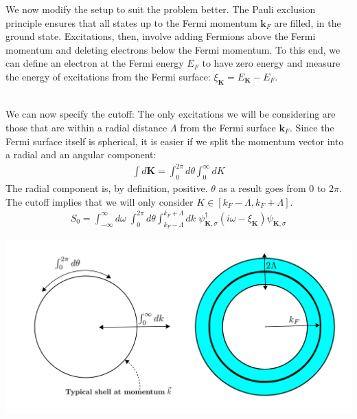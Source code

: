 \documentclass[14pt]{extarticle}
\begin{document}
We now modify the setup to suit the problem better. The Pauli exclusion principle ensures that all states up to the Fermi momentum \(\mathbf{k}_F\) are filled, in the ground state. Excitations, then, involve adding Fermions above the Fermi momentum and deleting electrons below the Fermi momentum. To this end, we can define an electron at the Fermi energy \(E_F\) to have zero energy and measure the energy of excitations from the Fermi surface: \(\xi_{\mathbf K} = E_{\mathbf K} - E_F\).
\\\\
\begin{minipage}{0.45\textwidth}
We can now specify the cutoff: The only excitations we will be considering are those that are within a radial distance \(\Lambda\) from the Fermi surface \(\mathbf{k}_F\). Since the Fermi surface itself is spherical, it is easier if we split the momentum vector into a radial and an angular component:
\begin{equation}\begin{aligned}
\int d\mathbf{K} = \int_0^{2\pi} d\theta \int_0^\infty dK
\end{aligned}\end{equation}
The radial component is, by definition, positive. \(\theta\) as a result goes from \(0\) to \(2\pi\). The cutoff implies that we will only consider \(K \in \left[k_F - \Lambda, k_F + \Lambda\right]\).
\begin{equation}\begin{aligned}
	S_0 = \int_{-\infty}^\infty d\omega\;\int_0^{2\pi} d\theta \int_{k_F - \Lambda}^{k_F + \Lambda}  dk\; \psi_{\mathbf{K},\sigma}^\dagger \left(i\omega - \xi_{\mathbf{K}}\right)\psi_{\mathbf{K},\sigma}
\end{aligned}\end{equation}
\end{minipage}
\hspace*{\fill}
\begin{minipage}{0.5\textwidth}
\centering
\includegraphics[width=\textwidth]{./figures/fermi-rg.png}
\end{minipage}
\end{document}
